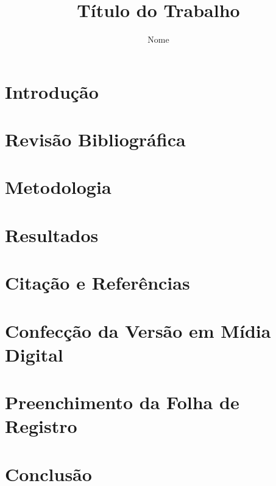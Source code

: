 \documentclass[msc]{ita}    %
\author{Nome}{Sobrenome}
\title{Título do Trabalho}
\date{\placeholder{dia}}{\placeholder{mês}}{\placeholder{ano}}
\begin{document}


\mainmatter

\chapter{Introdução}


\chapter{Revisão Bibliográfica}


\chapter{Metodologia}

% 
\chapter{Resultados}


\chapter{Citação e Referências}


\chapter{Confecção da Versão em Mídia Digital}


\chapter{Preenchimento da Folha de Registro}


\chapter{Conclusão}


\renewcommand\bibname{\itareferencesnamebabel} %
\printbibliography[heading=bibintoc]


\appendix
\end{document}
